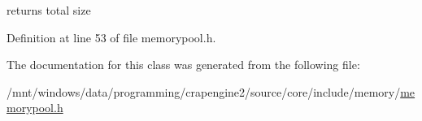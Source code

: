 returns total size 



Definition at line 53 of file memorypool.\+h.



The documentation for this class was generated from the following file\+:\begin{DoxyCompactItemize}
\item 
/mnt/windows/data/programming/crapengine2/source/core/include/memory/\hyperlink{memorypool_8h}{memorypool.\+h}\end{DoxyCompactItemize}
